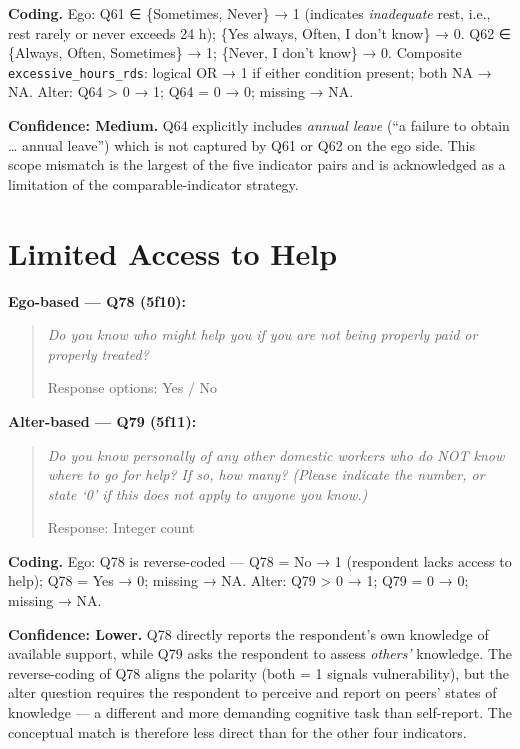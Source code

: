 \documentclass[
  12pt,
  letterpaper,
  DIV=11,
  numbers=noendperiod]{scrreprt}
\begin{document}
\textbf{Coding.} Ego: Q61 ∈ \{Sometimes, Never\} → 1 (indicates
\emph{inadequate} rest, i.e., rest rarely or never exceeds 24 h); \{Yes
always, Often, I don't know\} → 0. Q62 ∈ \{Always, Often, Sometimes\} →
1; \{Never, I don't know\} → 0. Composite
\texttt{excessive\_hours\_rds}: logical OR → 1 if either condition
present; both NA → NA. Alter: Q64 \textgreater{} 0 → 1; Q64 = 0 → 0;
missing → NA.

\textbf{Confidence: Medium.} Q64 explicitly includes \emph{annual leave}
(``a failure to obtain \ldots{} annual leave'') which is not captured by
Q61 or Q62 on the ego side. This scope mismatch is the largest of the
five indicator pairs and is acknowledged as a limitation of the
comparable-indicator strategy.

\section{Limited Access to Help}\label{sec-b-help}

\textbf{Ego-based --- Q78 (5f10):}

\begin{quote}
\emph{Do you know who might help you if you are not being properly paid
or properly treated?}

Response options: Yes / No
\end{quote}

\textbf{Alter-based --- Q79 (5f11):}

\begin{quote}
\emph{Do you know personally of any other domestic workers who do NOT
know where to go for help? If so, how many? (Please indicate the number,
or state `0' if this does not apply to anyone you know.)}

Response: Integer count
\end{quote}

\textbf{Coding.} Ego: Q78 is reverse-coded --- Q78 = No → 1 (respondent
lacks access to help); Q78 = Yes → 0; missing → NA. Alter: Q79
\textgreater{} 0 → 1; Q79 = 0 → 0; missing → NA.

\textbf{Confidence: Lower.} Q78 directly reports the respondent's own
knowledge of available support, while Q79 asks the respondent to assess
\emph{others'} knowledge. The reverse-coding of Q78 aligns the polarity
(both = 1 signals vulnerability), but the alter question requires the
respondent to perceive and report on peers' states of knowledge --- a
different and more demanding cognitive task than self-report. The
conceptual match is therefore less direct than for the other four
indicators.
\end{document}
